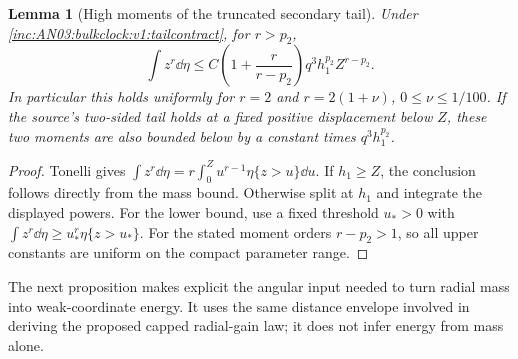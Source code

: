 \documentclass[11pt]{article}
\newtheorem{lemma}[theorem]{Lemma}\newtheorem{corollary}[theorem]{Corollary}
\theoremstyle{remark}\newtheorem{remark}[theorem]{Remark}
\begin{document}
\begin{lemma}[High moments of the truncated secondary tail]
\label{inc:AN03:bulkclock:v1:moments}
Under \eqref{inc:AN03:bulkclock:v1:tailcontract}, for $r>p_2$,
\[
 \int z^r\dd\eta\le C\left(1+\frac{r}{r-p_2}\right)
 q^3h_1^{p_2}Z^{r-p_2}.
\]
In particular this holds uniformly for $r=2$ and $r=2(1+\nu)$, $0\le\nu\le1/100$. If the source's two-sided tail holds at a fixed positive displacement below $Z$, these two moments are also bounded below by a constant times $q^3h_1^{p_2}$.
\end{lemma}
\begin{proof}
Tonelli gives $\int z^r\dd\eta=r\int_0^Z u^{r-1}\eta\{z>u\}\dd u$.
If $h_1\ge Z$, the conclusion follows directly from the mass bound. Otherwise split at $h_1$ and integrate the displayed powers. For the lower bound, use a fixed threshold $u_*>0$ with $\int z^r\dd\eta\ge u_*^r\eta\{z>u_*\}$. For the stated moment orders $r-p_2>1$, so all upper constants are uniform on the compact parameter range.
\end{proof}

The next proposition makes explicit the angular input needed to turn radial mass into weak-coordinate energy. It uses the same distance envelope involved in deriving the proposed capped radial-gain law; it does not infer energy from mass alone.
\end{document}
